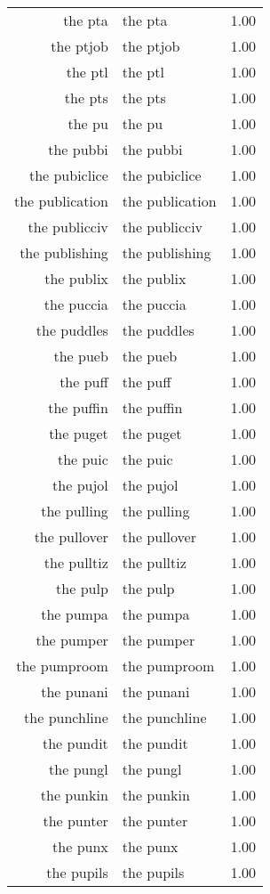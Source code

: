 \begin{table}[ht]
\begin{tabular}{rlr}
  the pta & the pta & 1.00 \\ 
  the ptjob & the ptjob & 1.00 \\ 
  the ptl & the ptl & 1.00 \\ 
  the pts & the pts & 1.00 \\ 
  the pu & the pu & 1.00 \\ 
  the pubbi & the pubbi & 1.00 \\ 
  the pubiclice & the pubiclice & 1.00 \\ 
  the publication & the publication & 1.00 \\ 
  the publicciv & the publicciv & 1.00 \\ 
  the publishing & the publishing & 1.00 \\ 
  the publix & the publix & 1.00 \\ 
  the puccia & the puccia & 1.00 \\ 
  the puddles & the puddles & 1.00 \\ 
  the pueb & the pueb & 1.00 \\ 
  the puff & the puff & 1.00 \\ 
  the puffin & the puffin & 1.00 \\ 
  the puget & the puget & 1.00 \\ 
  the puic & the puic & 1.00 \\ 
  the pujol & the pujol & 1.00 \\ 
  the pulling & the pulling & 1.00 \\ 
  the pullover & the pullover & 1.00 \\ 
  the pulltiz & the pulltiz & 1.00 \\ 
  the pulp & the pulp & 1.00 \\ 
  the pumpa & the pumpa & 1.00 \\ 
  the pumper & the pumper & 1.00 \\ 
  the pumproom & the pumproom & 1.00 \\ 
  the punani & the punani & 1.00 \\ 
  the punchline & the punchline & 1.00 \\ 
  the pundit & the pundit & 1.00 \\ 
  the pungl & the pungl & 1.00 \\ 
  the punkin & the punkin & 1.00 \\ 
  the punter & the punter & 1.00 \\ 
  the punx & the punx & 1.00 \\ 
  the pupils & the pupils & 1.00 \\ 

\end{tabular}
\end{table}
